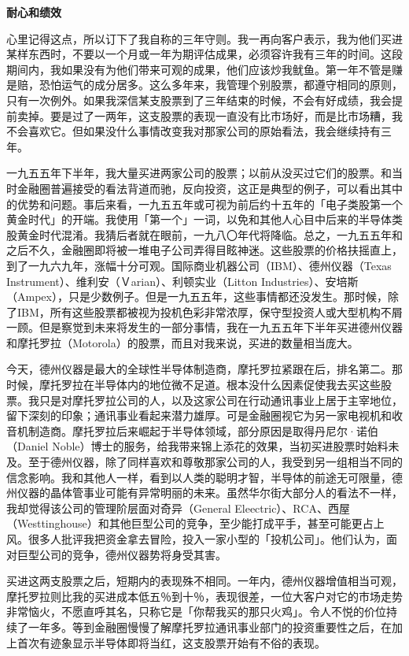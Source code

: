 \documentclass[UTF8,a4paper,zihao=-4,fontset = windows]{ctexart} %
\begin{document}
\textbf{耐心和绩效}


心里记得这点，所以订下了我自称的三年守则。我一再向客户表示，我为他们买进某样东西时，不要以一个月或一年为期评估成果，必须容许我有三年的时间。这段期间内，我如果没有为他们带来可观的成果，他们应该炒我鱿鱼。第一年不管是赚是赔，恐怕运气的成分居多。这么多年来，我管理个别股票，都遵守相同的原则，只有一次例外。如果我深信某支股票到了三年结束的时候，不会有好成绩，我会提前卖掉。要是过了一两年，这支股票的表现一直没有比市场好，而是比市场糟，我不会喜欢它。但如果没什么事情改变我对那家公司的原始看法，我会继续持有三年。

一九五五年下半年，我大量买进两家公司的股票；以前从没买过它们的股票。和当时金融圈普遍接受的看法背道而驰，反向投资，这正是典型的例子，可以看出其中的优势和问题。事后来看，一九五五年或可视为前后约十五年的「电子类股第一个黄金时代」的开端。我使用「第一个」一词，以免和其他人心目中后来的半导体类股黄金时代混淆。我猜后者就在眼前，一九八〇年代将降临。总之，一九五五年和之后不久，金融圈即将被一堆电子公司弄得目眩神迷。这些股票的价格扶摇直上，到了一九六九年，涨幅十分可观。国际商业机器公司（IBM）、德州仪器（Texas Instrument）、维利安（Ｖarian）、利顿实业（Litton Industries）、安培斯（Ampex），只是少数例子。但是一九五五年，这些事情都还没发生。那时候，除了IBM，所有这些股票都被视为投机色彩非常浓厚，保守型投资人或大型机构不屑一顾。但是察觉到未来将发生的一部分事情，我在一九五五年下半年买进德州仪器和摩托罗拉（Motorola）的股票，而且对我来说，买进的数量相当庞大。

今天，德州仪器是最大的全球性半导体制造商，摩托罗拉紧跟在后，排名第二。那时候，摩托罗拉在半导体内的地位微不足道。根本没什么因素促使我去买这些股票。我只是对摩托罗拉公司的人，以及这家公司在行动通讯事业上居于主宰地位，留下深刻的印象；通讯事业看起来潜力雄厚。可是金融圈视它为另一家电视机和收音机制造商。摩托罗拉后来崛起于半导体领域，部分原因是取得丹尼尔·诺伯（Daniel Noble）博士的服务，给我带来锦上添花的效果，当初买进股票时始料未及。至于德州仪器，除了同样喜欢和尊敬那家公司的人，我受到另一组相当不同的信念影响。我和其他人一样，看到以人类的聪明才智，半导体的前途无可限量，德州仪器的晶体管事业可能有异常明丽的未来。虽然华尔街大部分人的看法不一样，我却觉得该公司的管理阶层面对奇异（General Eleectric）、RCA、西屋（Westtinghouse）和其他巨型公司的竞争，至少能打成平手，甚至可能更占上风。很多人批评我把资金拿去冒险，投入一家小型的「投机公司」。他们认为，面对巨型公司的竞争，德州仪器势将身受其害。

买进这两支股票之后，短期内的表现殊不相同。一年内，德州仪器增值相当可观，摩托罗拉则比我的买进成本低五％到十％，表现很差，一位大客户对它的市场走势非常恼火，不愿直呼其名，只称它是「你帮我买的那只火鸡」。令人不悦的价位持续了一年多。等到金融圈慢慢了解摩托罗拉通讯事业部门的投资重要性之后，在加上首次有迹象显示半导体即将当红，这支股票开始有不俗的表现。
\end{document}
